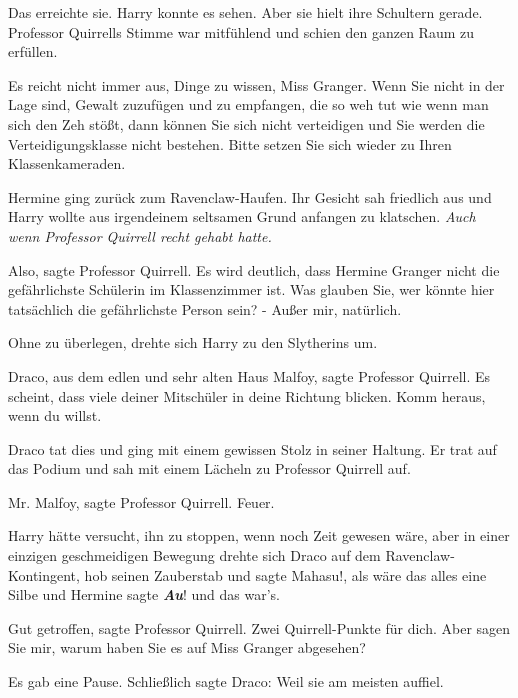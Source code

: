 Das erreichte sie. Harry konnte es sehen. Aber sie hielt ihre Schultern gerade.
Professor Quirrells Stimme war mitfühlend und schien den ganzen Raum zu
erfüllen.

\glqq{}Es reicht nicht immer aus, Dinge zu wissen, Miss Granger. Wenn Sie nicht
in der Lage sind, Gewalt zuzufügen und zu empfangen, die so weh tut wie wenn man
sich den Zeh stößt, dann können Sie sich nicht verteidigen und Sie werden die
Verteidigungsklasse nicht bestehen. Bitte setzen Sie sich wieder zu Ihren
Klassenkameraden.\grqq{}

Hermine ging zurück zum Ravenclaw-Haufen. Ihr Gesicht sah friedlich aus und
Harry wollte aus irgendeinem seltsamen Grund anfangen zu klatschen. \emph{Auch
wenn Professor Quirrell recht gehabt hatte.}

\glqq{}Also\grqq{}, sagte Professor Quirrell. \glqq{}Es wird deutlich, dass
Hermine Granger nicht die gefährlichste Schülerin im Klassenzimmer ist. Was
glauben Sie, wer könnte hier tatsächlich die gefährlichste Person sein? - Außer
mir, natürlich.\grqq{}

Ohne zu überlegen, drehte sich Harry zu den Slytherins um.

\glqq{}Draco, aus dem edlen und sehr alten Haus Malfoy\grqq{}, sagte Professor
Quirrell. \glqq{}Es scheint, dass viele deiner Mitschüler in deine Richtung
blicken. Komm heraus, wenn du willst.\grqq{}

Draco tat dies und ging mit einem gewissen Stolz in seiner Haltung. Er trat auf
das Podium und sah mit einem Lächeln zu Professor Quirrell auf.

\glqq{}Mr. Malfoy\grqq{}, sagte Professor Quirrell. \glqq{}Feuer.\grqq{}

Harry hätte versucht, ihn zu stoppen, wenn noch Zeit gewesen wäre, aber in einer
einzigen geschmeidigen Bewegung drehte sich Draco auf dem Ravenclaw-Kontingent,
hob seinen Zauberstab und sagte \glqq{}Mahasu!\grqq{}, als wäre das alles eine
Silbe und Hermine sagte \glqq{}\textbf{\emph{Au}}!\grqq{} und das war's.

\glqq{}Gut getroffen\grqq{}, sagte Professor Quirrell. \glqq{}Zwei Quirrell-Punkte
für dich. Aber sagen Sie mir, warum haben Sie es auf Miss Granger
abgesehen?\grqq{}

Es gab eine Pause. Schließlich sagte Draco: \glqq{}Weil sie am meisten
auffiel.\grqq{}

